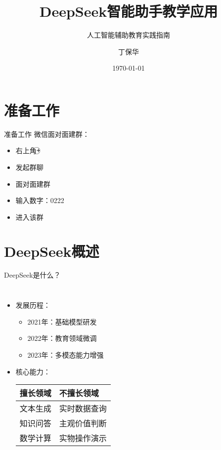 \documentclass[aspectratio=169]{beamer}
\title{DeepSeek智能助手教学应用}
\subtitle{人工智能辅助教育实践指南}
\author{丁保华}
\institute{致慧星空工作室}
\date{\today}
\begin{document}
\maketitle

\section{准备工作}
\begin{frame}[t]{准备工作}
微信面对面建群：\\
\begin{itemize}
\item 右上角\textcircled{+}
\item 发起群聊
\item 面对面建群
\item 输入数字：\alert{0222}
\item 进入该群
\end{itemize}
\end{frame}

\section{DeepSeek概述}
\begin{frame}{DeepSeek是什么？}
  \begin{columns}
    \begin{itemize}
      \item 发展历程：
        \begin{itemize}
          \item 2021年：基础模型研发
          \item 2022年：教育领域微调
          \item 2023年：多模态能力增强
        \end{itemize}
      \item 核心能力：
        \begin{tabular}{ll}
          \toprule
          擅长领域 & 不擅长领域 \\
          \midrule
          文本生成 & 实时数据查询 \\
          知识问答 & 主观价值判断 \\
          数学计算 & 实物操作演示 \\
          \bottomrule
        \end{tabular}
    \end{itemize}

  \end{columns}
\end{frame}
\end{document}
